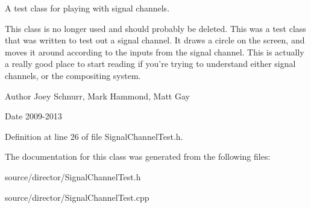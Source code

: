 A test class for playing with signal channels.

This class is no longer used and should probably be deleted. This was a test class that was written to test out a signal channel. It draws a circle on the screen, and moves it around according to the inputs from the signal channel. This is actually a really good place to start reading if you're trying to understand either signal channels, or the compositing system. \begin{DoxyAuthor}{Author}
Joey Schnurr, Mark Hammond, Matt Gay 
\end{DoxyAuthor}
\begin{DoxyDate}{Date}
2009-\/2013 
\end{DoxyDate}


Definition at line 26 of file Signal\-Channel\-Test.\-h.



The documentation for this class was generated from the following files\-:\begin{DoxyCompactItemize}
\item 
source/director/Signal\-Channel\-Test.\-h\item 
source/director/Signal\-Channel\-Test.\-cpp\end{DoxyCompactItemize}
